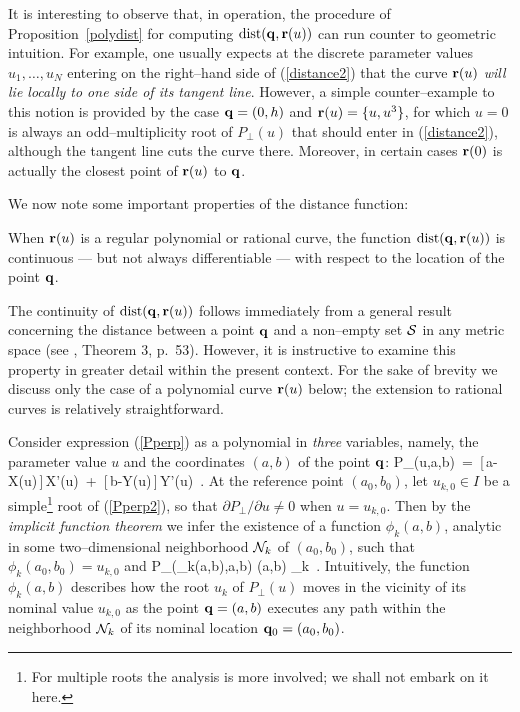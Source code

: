 \begin{exmpl}
{\rm
It is interesting to observe that, in operation, the procedure of
Proposition~\ref{polydist} for computing ${\rm dist}({\bf q},{\bf r}(u))$
can run counter to geometric intuition. For example, one usually
expects at the discrete parameter values $u_1,\dots,u_N$ entering
on the right--hand side of (\ref{distance2}) that the curve
${\bf r}(u)$ {\it will lie locally to one side of its tangent line}.
However, a simple counter--example to this notion is provided by
the case ${\bf q}=(0,h)$ and ${\bf r}(u)=\{u,u^3\}$, for which
$u=0$ is always an odd--multiplicity root of $P_\perp(u)$ that
should enter in (\ref{distance2}), although the tangent line cuts
the curve there. Moreover, in certain cases ${\bf r}(0)$ is actually
the closest point of ${\bf r}(u)$ to ${\bf q}$.
} \QED
\end{exmpl}

We now note some important properties of the distance function:

\begin{propn}
When ${\bf r}(u)$ is a regular polynomial or rational curve, the
function ${\rm dist}({\bf q},{\bf r}(u))$ is continuous --- but not
always differentiable --- with respect to the location of the point
${\bf q}$.
\end{propn}

\prf The continuity of ${\rm dist}({\bf q},{\bf r}(u))$ follows immediately
from a general result concerning the distance between a point ${\bf q}$
and a non--empty set ${\cal S}$ in any metric space (see \cite{kelly79},
Theorem 3, p.~53). However, it is instructive to examine this property
in greater detail within the present context. For the sake of brevity
we discuss only the case of a polynomial curve ${\bf r}(u)$ below; the
extension to rational curves is relatively straightforward.

Consider expression (\ref{Pperp}) as a polynomial in {\it three\/}
variables, namely, the parameter value $u$ and the coordinates
$(a,b)$ of the point ${\bf q}$:
\be \label{Pperp2}
P_\perp(u,a,b) \,=\,
[\,a-X(u)\,]\,X'(u) \,+\, [\,b-Y(u)\,]\,Y'(u) \,.
\ee
At the reference point $(a_0,b_0)$, let $u_{k,0} \in I$ be a
simple\footnote{For multiple roots the analysis is more involved;
we shall not embark on it here.} root of (\ref{Pperp2}), so that
$\partial P_\perp/\partial u\not=0$ when $u=u_{k,0}$. Then by
the {\it implicit function theorem\/} \cite [p.~362]{buck78} we
infer the existence of a function $\phi_k(a,b)$, analytic in some
two--dimensional neighborhood ${\cal N}_k$ of $(a_0,b_0)$, such
that $\phi_k(a_0,b_0)=u_{k,0}$ and
\be
P_\perp(\phi_k(a,b),a,b) 
 (a,b) _k \,.
\ee
Intuitively, the function $\phi_k(a,b)$ describes how the root $u_k$
of $P_\perp(u)$ moves in the vicinity of its nominal value $u_{k,0}$
as the point ${\bf q}=(a,b)$ executes any path within the neighborhood
${\cal N}_k$ of its nominal location ${\bf q}_0=(a_0,b_0)$.

